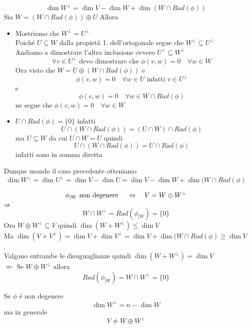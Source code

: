 \begin{cor}\
$$ \dim W^\perp = \dim V - \dim W + \dim ( W\cap Rad (\phi) )$$
\proof
Sia $ W = ( W \cap  Rad (\phi) ) \oplus U $
Allora 
\begin{itemize}
\item Mostriamo che $W^\perp = U^\perp $ \\
Poich\'e $U\subseteq W$ dalla propiet\'a 1. dell'ortogonale segue che $ W^\perp \subseteq U^\perp $ \\
Andiamo a dimostrare l'altra inclusione ovvero $U^\perp \subseteq W^\perp$
$$ \forall v \in U^\perp \text{ devo dimostrare che } \phi(v,w)=0 \quad \forall w\in W $$
Ora visto che $W= U \oplus ( W \cap Rad (\phi)) $ e 
$$ \phi (v,w)= 0\quad  \forall w \in U \text{ infatti }  v\in U^\perp$$
e
$$ \phi (v,w)=0 
\quad \forall w \in W \cap Rad(\phi)$$
ne segue che 
$ \phi(v,w)= 0 \quad \forall w \in W $

\item $U\cap Rad(\phi)=\{0\}$ infatti 
$$U \cap( W \cap Rad(\phi))=(U \cap W) \cap Rad(\phi)  $$ ma $ U\subseteq W $ da cui $U \cap W= U$ quindi
$$U \cap (W \cap Rad(\phi)) = U \cap Rad (\phi)$$ infatti sono in somma diretta 
\end{itemize}
Dunque usando il caso precedente otteniamo $$\dim W^\perp = \dim U^\perp = \dim V - \dim U =\dim V - \dim W + \dim (W \cap Rad(\phi) $$
\endproof
\end{cor}
\begin{cor} \label{cor15.11}$$ \phi_{\vert W } \text{ non degenere } \quad \Leftrightarrow \quad V = W \oplus W^\perp$$
\proof $ \Rightarrow$ 
$$ W \cap W^\perp = Rad ( \phi_{\vert W } ) =\{0\} $$ 
Ora $ W\oplus W^\perp \subseteq V$ quindi $\dim (W + W^\perp) \leq \dim V $\\
Ma $\dim (V+ V^\perp) = \dim V + \dim V^\perp = \dim V + \dim ( W\cap Rad(\phi) \geq \dim V $.\\
Valgono entrambe le disuguaglianze quindi $\dim(W+W^\perp)= \dim V $ \\ 
$\Leftarrow$ Se $W\oplus W^\perp $ allora
$$ Rad(\phi_{\vert W} )= W\cap W^\perp = \{ 0 \} $$
\endproof
\end{cor}
\begin{oss} Se $\phi$ \'e non degenere
$$ \dim W^\perp = n - \dim W$$  ma in generale 
$$ V\not = W \oplus W^\perp$$
\end{oss}
\newpage


\newpage
